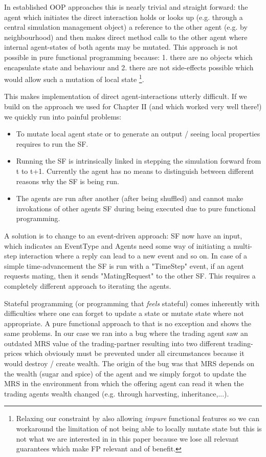 In established OOP approaches this is nearly trivial and straight forward: the agent which initiates the direct interaction holds or looks up (e.g. through a central simulation management object) a reference to the other agent (e.g. by neighbourhood) and then makes direct method calls to the other agent where internal agent-states of both agents may be mutated.
This approach is not possible in pure functional programming because: 1. there are no objects which encapsulate state and behaviour and 2. there are not side-effects possible which would allow such a mutation of local state \footnote{Relaxing our constraint by also allowing \textit{impure} functional features so we can workaround the limitation of not being able to locally mutate state but this is not what we are interested in in this paper because we lose all relevant guarantees which make FP relevant and of benefit.}. 

This makes implementation of direct agent-interactions utterly difficult.
If we build on the approach we used for Chapter II (and which worked very well there!) we quickly run into painful problems:
\begin{itemize}
	\item To mutate local agent state or to generate an output / seeing local properties requires to run the SF. 
	\item Running the SF is intrinsically linked in stepping the simulation forward from t to t+1. Currently the agent has no means to distinguish between different reasons why the SF is being run.
	\item The agents are run after another (after being shuffled) and cannot make invokations of other agents SF during being executed due to pure functional programming.
\end{itemize}

A solution is to change to an event-driven approach: SF now have an input, which indicates an EventType and Agents need some way of initiating a multi-step interaction where a reply can lead to a new event and so on. In case of a simple time-advancement the SF is run with a "TimeStep" event, if an agent requests mating, then it sends "MatingRequest" to the other SF. This requires a completely different approach to iterating the agents.

Stateful programming (or programming that \textit{feels} stateful) comes inherently with difficulties where one can forget to update a state or mutate state where not appropriate. A pure functional approach to that is no exception and shows the same problems. In our case we ran into a bug where the trading agent saw an outdated MRS value of the trading-partner resulting into two different trading-prices which obviously must be prevented under all circumstances because it would destroy / create wealth. The origin of the bug was that MRS depends on the wealth (sugar and spice) of the agent and we simply forgot to update the MRS in the environment from which the offering agent can read it when the trading agents wealth changed (e.g. through harvesting, inheritance,...).

